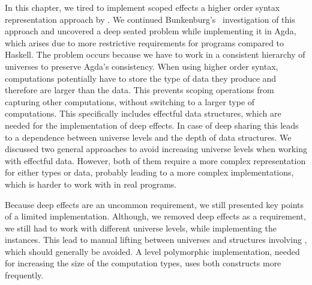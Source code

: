 In this chapter, we tired to implement scoped effects a higher order
syntax representation approach by \textcite{DBLP:conf/haskell/WuSH14}.
We continued Bunkenburg's~\cite{bunkenburg2019modeling} investigation of this
approach and uncovered a deep seated problem while implementing it in Agda,
which arises due to more restrictive requirements for programs compared to
Haskell.
The problem occurs because we have to work in a consistent hierarchy of
universes to preserve Agda's consistency.
When using higher order syntax, computations potentially have to store the type
of data they produce and therefore are larger than the data.
This prevents scoping operations from capturing other computations, without
switching to a larger type of computations.
This specifically includes effectful data structures, which are needed for the
implementation of deep effects.
In case of deep sharing this leads to a dependence between universe levels and
the depth of data structures.
We discussed two general approaches to avoid increasing universe levels when
working with effectful data.
However, both of them require a more complex representation for either types or
data, probably leading to a more complex implementations, which is harder to
work with in real programs.

Because deep effects are an uncommon requirement, we still presented key points
of a limited implementation.
Although, we removed deep effects as a requirement, we still had to work with
different universe levels, while implementing the 
instances.
This lead to manual lifting between universes and structures involving
, which should generally be avoided.
A level polymorphic implementation, needed for increasing the size of the
computation types, uses both constructs more frequently.

